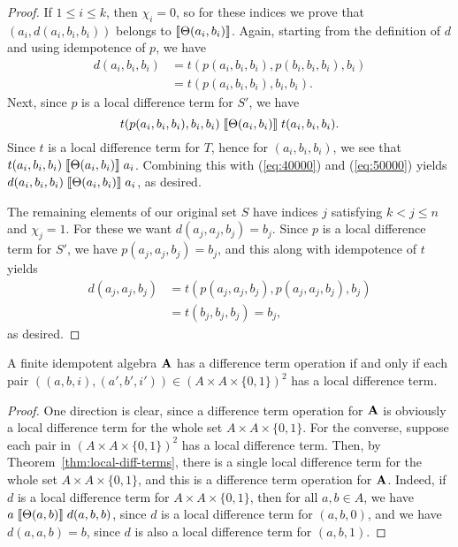 \begin{proof}
If $1\leq i \leq k$, then $\chi_i =0$, so for these indices we prove
that $(a_i, d(a_i,b_i,b_i))$ belongs to $\llbracket \Theta(a_i,b_i) \rrbracket$.
Again, starting from the definition of $d$ and using idempotence of $p$, we have
\begin{align}
  d(a_i,b_i,b_i) &=
  t(p(a_i,b_i,b_i), p(b_i,b_i,b_i), b_i)   \label{eq:40000}\\
  &=t(p(a_i,b_i,b_i), b_i, b_i). \nonumber
\end{align}
Next, since $p$ is a local difference term for $S'$, we have
\begin{equation}
  \label{eq:50000}
  t(p(a_i,b_i,b_i), b_i, b_i)
 \comr{\Cg(a_i,b_i)}
 t(a_i, b_i, b_i).
\end{equation}
Since $t$ is a local difference term for $T$, hence for
$(a_i, b_i, b_i)$,  %
we see that 
$t(a_i, b_i, b_i) \mathrel{\llbracket \Theta(a_i,b_i) \rrbracket} a_i$.
Combining this with (\ref{eq:40000}) and (\ref{eq:50000}) yields
$d(a_i,b_i,b_i) \mathrel{\llbracket \Theta(a_i,b_i) \rrbracket} a_i$,
as desired.

The remaining elements of our original set $S$
have indices $j$ satisfying $k<j\leq n$ and $\chi_j = 1$.
For these we want $d(a_j,a_j,b_j) = b_j$.
Since $p$ is a local difference term for $S'$, we have
$p(a_j,a_j,b_j) = b_j$, and this along with idempotence of $t$ yields
\begin{align*}
d(a_j,a_j,b_j) &=
t(p(a_j,a_j,b_j), p(a_j,a_j,b_j), b_j)\\
&=t(b_j, b_j, b_j) =b_j,
\end{align*}
as desired.
\end{proof}

\begin{cor}
  \label{cor:loc-diff-term}
  A finite idempotent algebra $\mathbf{A}$ has a difference term operation if and
  only if each pair $((a,b,i), (a',b',i')) \in (A\times A \times \{0,1\})^2$ has a local
  difference term.
\end{cor}
\begin{proof}
  One direction is clear, since a difference term operation for $\mathbf{A}$ is
  obviously a local difference term for the whole set 
  $A\times A \times \{0,1\}$.
  For the converse, suppose
  each pair in $(A\times A \times \{0,1\})^2$ has a local
  difference term. Then, by Theorem~\ref{thm:local-diff-terms},
  there is a single local difference term for the whole set $A\times A \times \{0,1\}$,
  and this is a difference term operation for $\mathbf{A}$.  Indeed, if $d$ is a
  local difference term for $A\times A \times \{0,1\}$, then 
  for all $a, b \in A$, we have
  $a \mathrel{\llbracket \Theta(a,b) \rrbracket} d(a,b,b)$,
  since $d$ is a local difference term for $(a,b,0)$, and we have
  $d(a,a,b) = b$, since $d$ is also a local difference term for
  $(a,b,1)$.
\end{proof}

